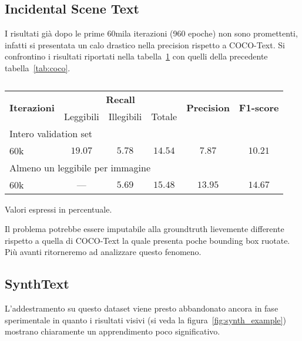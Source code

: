

\subsection{Incidental Scene Text}
\label{subsec:train_inc}
I risultati già dopo le prime 60mila iterazioni (960 epoche) non sono promettenti, infatti si presentata un calo drastico nella precision rispetto a COCO-Text. Si confrontino i risultati riportati nella tabella~\ref{tab:incidental} con quelli della precedente tabella~\ref{tab:coco}.

\begin{table}[H]
\centering
\begin{threeparttable}
	\begin{tabular}{l*{5}c}
		\toprule
		\multirow{2}{*}{\textbf{Iterazioni}} & \multicolumn{3}{c}{\textbf{Recall}} & \multirow{2}{*}{\textbf{Precision}} & \multirow{2}{*}{\textbf{F1-score}} \\
		\cmidrule(lr){2-4}
		& Leggibili & Illegibili & Totale &  &  \\
		\midrule
		\multicolumn{6}{l}{Intero validation set} \\
		60k		& $19.07$ & $5.78$ & $14.54$ & $7.87$ & $10.21$ \\
		\midrule
		\multicolumn{6}{l}{Almeno un leggibile per immagine} \\
		60k		&   ---   & $5.69$ & $15.48$ & $13.95$ & $14.67$ \\
		\bottomrule
	\end{tabular}
	\begin{tablenotes}
		\item \footnotesize{Valori espressi in percentuale.}
	\end{tablenotes}
\end{threeparttable}
\caption{}\label{tab:incidental}
\end{table}


Il problema potrebbe essere imputabile alla groundtruth lievemente differente rispetto a quella di COCO-Text la quale presenta poche bounding box ruotate. Più avanti ritorneremo ad analizzare questo fenomeno.


\subsection{SynthText}
L'addestramento su questo dataset viene presto abbandonato ancora in fase sperimentale in quanto i risultati visivi (si veda la figura~\ref{fig:synth_example}) mostrano chiaramente un apprendimento poco significativo.\par

